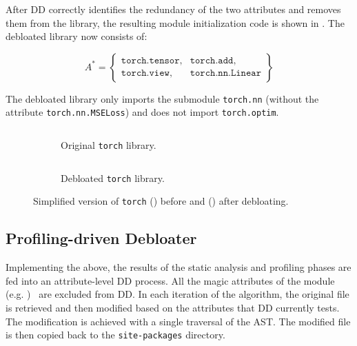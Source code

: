 \documentclass[sigplan,nonacm]{acmart}
\newcounter{example}
\newcommand{\module}[1]{{\texttt{#1}}}
\newcommand{\attribute}[1]{\texttt{#1}}
\begin{document}
After DD correctly identifies the redundancy of the two attributes and removes them from the library, the resulting module initialization code is shown in .
The debloated library now consists of:

{\footnotesize\[
A^{*} = \left\{
\begin{array}{ll}
\attribute{torch.tensor}, & \attribute{torch.add}, \\
\attribute{torch.view}, & \attribute{torch.nn.Linear}
\end{array}
\right\}
\]}

\noindent
The debloated library only imports the submodule \module{torch.nn} (without the attribute \attribute{torch.nn.MSELoss}) and does not import \module{torch.optim}.

\begin{figure*}[h]
    \centering
    \begin{subfigure}[b]{0.9\columnwidth}
        \centering
        \inputminted[fontsize=\scriptsize]{python}{chapters/6_debloating/torch.py}
        \caption{Original \module{torch} library.}
        \label{fig:torch-original}
    \end{subfigure}
    \hfill
    \begin{subfigure}[b]{0.9\columnwidth}
        \centering
        \inputminted[fontsize=\scriptsize]{python}{chapters/6_debloating/torch-debloated.py}
        \caption{Debloated \module{torch} library.}
        \label{fig:torch-example-debloated}
    \end{subfigure}
    \caption{Simplified version of \module{torch} () before and () after debloating.}
    \label{fig:torch_libraries}
\end{figure*}
 
\subsection{Profiling-driven Debloater}

Implementing the above, the results of the static analysis and profiling phases are fed into an attribute-level DD process.
All the magic attributes of the module (e.g. )~\cite{pep302} are excluded from DD.
In each iteration of the algorithm, the original  file is retrieved and then modified based on the attributes that DD currently tests.
The modification is achieved with a single traversal of the AST.
The modified  file is then copied back to the \verb|site-packages| directory.
\end{document}
